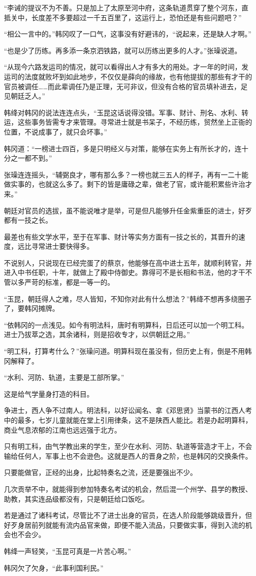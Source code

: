 “李诫的提议不为不善。只是加上了太原至河中府，这条轨道贯穿了整个河东，直抵关中，长度差不多要超过一千五百里了，这运行上，恐怕还是有些问题吧？”

“相公一言中的。”韩冈叹了一口气，这事没有好避讳的，“说起来，还是缺人才啊。”

“也是少了历练。再多添一条京泗铁路，就可以历练出更多的人才。”张璪说道。

“从现今六路发运司的情况，就可以看得出人才有多大的用处。才一年的时间，发运司的法度就败坏到如此地步，不仅仅是薛向的缘故，也有他提拔的那些有才干的官员被调任……而此辈调任乃是正理，无可非议，但没有合格的官员填补进去，足见朝廷乏人。”

韩绛对韩冈的说法连连点头，“玉昆这话说得没错。军事、财计、刑名、水利、转运，这些事务皆需专才来管理。寻常进士就是书呆子，不经历练，贸然坐上正衙的位置，不说成事了，就只会坏事。”

韩冈道：“一榜进士四百，多是只明经义与对策，能够在实务上有所长才的，连十分之一都不到。”

张璪连连摇头，“辅弼良才，哪有那么多？一榜也就三五人的样子，再有一二十能做实事的，也就这么多了。剩下的皆是庸碌之辈，做老了官，或许能积累些许治才来。”

朝廷对官员的选拔，虽不能说唯才是举，可是但凡能够升任金紫重臣的进士，好歹都有一技之长。

最差也有些文学水平，至于在军事、财计等实务方面有一技之长的，其晋升的速度，远比寻常进士要快得多。

不说别人，只说现在已经完蛋了的蔡京，他能够在高中进士五年，就顺利转官，并进入中书任职，十年，就做上了殿中侍御史。靠得可不是长相和书法，他的才干不管以多严苛的标准，都是一等一的。

“玉昆，朝廷得人之难，尽人皆知，不知你对此有什么想法？”韩绛不想再多绕圈子了，要韩冈摊牌。

“依韩冈的一点浅见。如今有明法科，唐时有明算科，日后还可以加一个明工科。进士乃拔萃之选，其余诸科，则是招收专才，以供朝廷之用。”

“明工科，打算考什么？”张璪问道。明算科现在虽没有，但历史上有，倒是不用韩冈解释了。

“水利、河防、轨道，主要是工部所掌。”

这是给气学量身打造的科目。

争进士，西人争不过南人。明法科，以好讼闻名、拿《邓思贤》当蒙书的江西人考中的最多，七岁儿童就能在堂上引用律条，这不是陕西人能比。若是办起明算科，商业气息浓郁的江南也远远强于北方。

只有明工科，由气学教出来的学生，至少在水利、河防、轨道等营造才干上，不会输给任何人，军事上也不会逊色。这就是西人的晋身之阶，也是韩冈的交换条件。

只要能做官，正经的出身，比起特奏名之流，还是要强出不少。

几次贡举不中，就能得到参加特奏名考试的机会，然后混一个州学、县学的教授、助教，其实连品级都没有，只是朝廷给口饭吃。

若是通过了诸科考试，尽管比不了进士出身的官员，在选人阶段能够跳级晋升，但好歹身居前列就能有流内品官来做，即便不能入流品，只要做实事，得到入流的机会也不会少。

韩绛一声轻笑，“玉昆可真是一片苦心啊。”

韩冈欠了欠身，“此事利国利民。”
